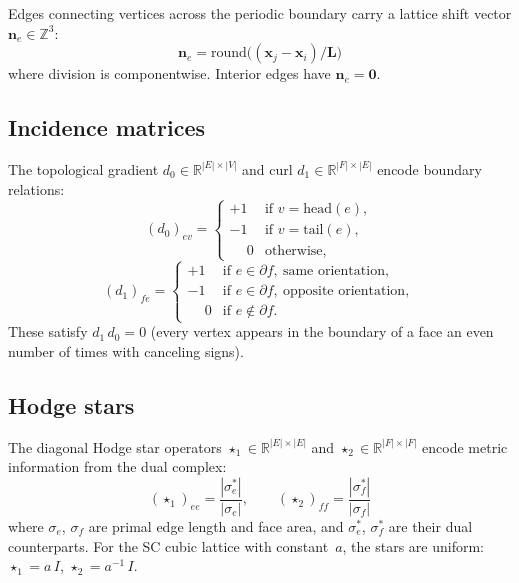 \documentclass[12pt]{article}
\theoremstyle{definition}
\theoremstyle{remark}
\newcommand{\RR}{\mathbb{R}}
\newcommand{\ZZ}{\mathbb{Z}}
\newcommand{\LL}{\mathbf{L}}
\newcommand{\nn}{\mathbf{n}}
\begin{document}
Edges connecting vertices across the periodic boundary carry a lattice shift
vector $\nn_e \in \ZZ^3$:
\begin{equation}\label{eq:shift}
  \nn_e = \mathrm{round}\!\bigl((\mathbf{x}_j - \mathbf{x}_i) / \LL\bigr)
\end{equation}
where division is componentwise. Interior edges have $\nn_e = \mathbf{0}$.

\subsection{Incidence matrices}

The topological gradient $d_0 \in \RR^{|E|\times|V|}$ and curl
$d_1 \in \RR^{|F|\times|E|}$ encode boundary relations:
\begin{equation}\label{eq:d0}
  (d_0)_{ev} = \begin{cases}
    +1 & \text{if } v = \mathrm{head}(e), \\
    -1 & \text{if } v = \mathrm{tail}(e), \\
    \phantom{+}0  & \text{otherwise},
  \end{cases}
\end{equation}
\begin{equation}\label{eq:d1}
  (d_1)_{fe} = \begin{cases}
    +1 & \text{if } e \in \partial f,\ \text{same orientation}, \\
    -1 & \text{if } e \in \partial f,\ \text{opposite orientation}, \\
    \phantom{+}0  & \text{if } e \notin \partial f.
  \end{cases}
\end{equation}
These satisfy $d_1\,d_0 = 0$ (every vertex appears in the boundary of a face
an even number of times with canceling signs).

\subsection{Hodge stars}

The diagonal Hodge star operators
$\star_1 \in \RR^{|E|\times|E|}$ and $\star_2 \in \RR^{|F|\times|F|}$
encode metric information from the dual complex:
\begin{equation}\label{eq:stars}
  (\star_1)_{ee} = \frac{|\sigma^*_e|}{|\sigma_e|}, \qquad
  (\star_2)_{ff} = \frac{|\sigma^*_f|}{|\sigma_f|}
\end{equation}
where $\sigma_e$, $\sigma_f$ are primal edge length and face area, and
$\sigma^*_e$, $\sigma^*_f$ are their dual counterparts. For the SC cubic
lattice with constant~$a$, the stars are uniform:
$\star_1 = a\,I$, $\star_2 = a^{-1}\,I$.
\end{document}
